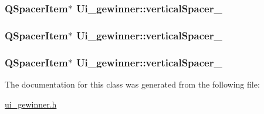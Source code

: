 \hypertarget{classUi__gewinner_ad278ce9c684f545f19a793534fbf3212}{
\subsubsection[{vertical\-Spacer\-\_\-3}]{\setlength{\rightskip}{0pt plus 5cm}Q\-Spacer\-Item$\ast$ Ui\-\_\-gewinner\-::vertical\-Spacer\-\_}}\label{classUi__gewinner_ad278ce9c684f545f19a793534fbf3212}
\hypertarget{classUi__gewinner_a3be237b715dad02b18b0d97589be8eb2}{
\subsubsection[{vertical\-Spacer\-\_\-4}]{\setlength{\rightskip}{0pt plus 5cm}Q\-Spacer\-Item$\ast$ Ui\-\_\-gewinner\-::vertical\-Spacer\-\_}}\label{classUi__gewinner_a3be237b715dad02b18b0d97589be8eb2}
\hypertarget{classUi__gewinner_a1d1c3d0c24f7155e4c396ef6b3cdec55}{
\subsubsection[{vertical\-Spacer\-\_\-5}]{\setlength{\rightskip}{0pt plus 5cm}Q\-Spacer\-Item$\ast$ Ui\-\_\-gewinner\-::vertical\-Spacer\-\_}}\label{classUi__gewinner_a1d1c3d0c24f7155e4c396ef6b3cdec55}


The documentation for this class was generated from the following file\-:\begin{DoxyCompactItemize}
\item 
\hyperlink{ui__gewinner_8h}{ui\-\_\-gewinner.\-h}\end{DoxyCompactItemize}
